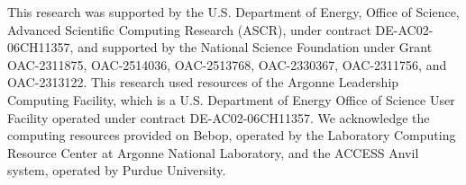 \documentclass[sigconf, nonacm]{acmart}
\begin{document}


\maketitle

\vldbtopmatter










\begin{acks}
This research was supported by the U.S. Department of Energy, Office of Science, Advanced Scientific Computing Research (ASCR), under contract DE-AC02-06CH11357, and supported by the National Science Foundation under Grant OAC-2311875, OAC-2514036, OAC-2513768, OAC-2330367, OAC-2311756, and OAC-2313122. 
This research used resources of the Argonne Leadership Computing Facility, which is a U.S. Department of Energy Office of Science User Facility operated under contract DE-AC02-06CH11357.
We acknowledge the computing resources provided on Bebop, operated by the Laboratory Computing Resource Center at Argonne National Laboratory, and the ACCESS Anvil system, operated by Purdue University.
\end{acks}




\end{document}
